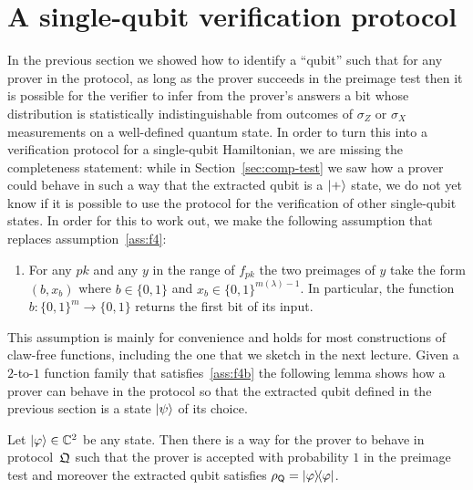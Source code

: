 \section{A single-qubit verification protocol}

In the previous section we showed how to identify a ``qubit'' such that for any prover in the protocol, as long as the prover succeeds in the preimage test then it is possible for the verifier to infer from the prover's answers a bit whose distribution is statistically indistinguishable from outcomes of $\sigma_Z$ or $\sigma_X$ measurements on a well-defined quantum state. In order to turn this into a verification protocol for a single-qubit Hamiltonian, we are missing the completeness statement: while in Section~\ref{sec:comp-test} we saw how a prover could behave in such a way that the extracted qubit is a $|+\rangle$ state, we do not yet know if it is possible to use the protocol for the verification of other single-qubit states. In order for this to work out, we make the following assumption that replaces assumption~\ref{ass:f4}:
\begin{enumerate}[label=(\textbf{F.4'})]
\item\label{ass:f4b} For any $pk$ and any $y$ in the range of $f_{pk}$ the two preimages of $y$ take the form $(b,x_b)$ where $b\in\{0,1\}$ and $x_b \in \{0,1\}^{m(\lambda)-1}$. In particular, the function $b:\{0,1\}^m \to \{0,1\}$ returns the first bit of its input. 
\end{enumerate}
This assumption is mainly for convenience and holds for most constructions of claw-free functions, including the one that we sketch in the next lecture. Given a $2$-to-$1$ function family that satisfies~\ref{ass:f4b} the following lemma shows how a prover can behave in the protocol so that the extracted qubit defined in the previous section is a state $|\psi\rangle$ of its choice. 

\begin{lemma}\label{lem:oq-completeness}
Let $|\varphi\rangle\in\mathbb{C}^2$ be any state. Then there is a way for the prover to behave in protocol~$\mathfrak{Q}$ such that the prover is accepted with probability $1$ in the preimage test and moreover the extracted qubit satisfies $\rho_{\textsf{Q}} = |\varphi\rangle\!\langle\varphi|$. 
\end{lemma}

